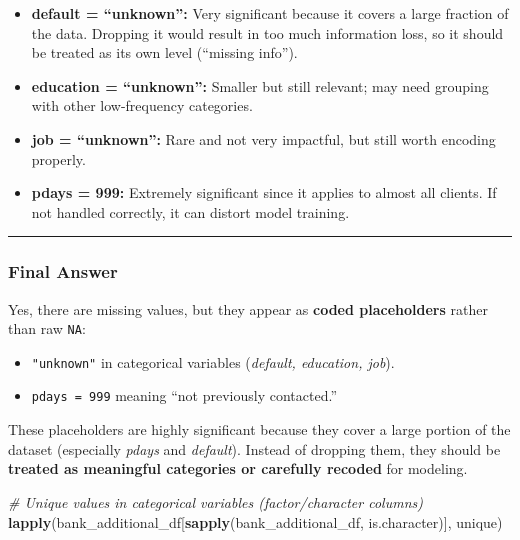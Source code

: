 \documentclass[
]{article}
\newenvironment{Shaded}{\begin{snugshade}}{\end{snugshade}}
\newcommand{\CommentTok}[1]{\textcolor[rgb]{0.56,0.35,0.01}{\textit{#1}}}
\newcommand{\FunctionTok}[1]{\textcolor[rgb]{0.13,0.29,0.53}{\textbf{#1}}}
\newcommand{\NormalTok}[1]{#1}
\providecommand{\tightlist}{%
  \setlength{\itemsep}{0pt}\setlength{\parskip}{0pt}}
\begin{document}
\begin{itemize}
\tightlist
\item
  \textbf{default = ``unknown'':} Very significant because it covers a
  large fraction of the data. Dropping it would result in too much
  information loss, so it should be treated as its own level (``missing
  info'').\\
\item
  \textbf{education = ``unknown'':} Smaller but still relevant; may need
  grouping with other low-frequency categories.\\
\item
  \textbf{job = ``unknown'':} Rare and not very impactful, but still
  worth encoding properly.\\
\item
  \textbf{pdays = 999:} Extremely significant since it applies to almost
  all clients. If not handled correctly, it can distort model training.
\end{itemize}

\begin{center}\rule{0.5\linewidth}{0.5pt}\end{center}

\subsubsection{Final Answer}\label{final-answer}

Yes, there are missing values, but they appear as \textbf{coded
placeholders} rather than raw \texttt{NA}:

\begin{itemize}
\tightlist
\item
  \texttt{"unknown"} in categorical variables (\emph{default, education,
  job}).\\
\item
  \texttt{pdays\ =\ 999} meaning ``not previously contacted.''
\end{itemize}

These placeholders are highly significant because they cover a large
portion of the dataset (especially \emph{pdays} and \emph{default}).
Instead of dropping them, they should be \textbf{treated as meaningful
categories or carefully recoded} for modeling.

\begin{Shaded}
\begin{Highlighting}[]
\CommentTok{\# Unique values in categorical variables (factor/character columns)}
\FunctionTok{lapply}\NormalTok{(bank\_additional\_df[}\FunctionTok{sapply}\NormalTok{(bank\_additional\_df, is.character)], unique)}
\end{Highlighting}
\end{Shaded}
\end{document}
